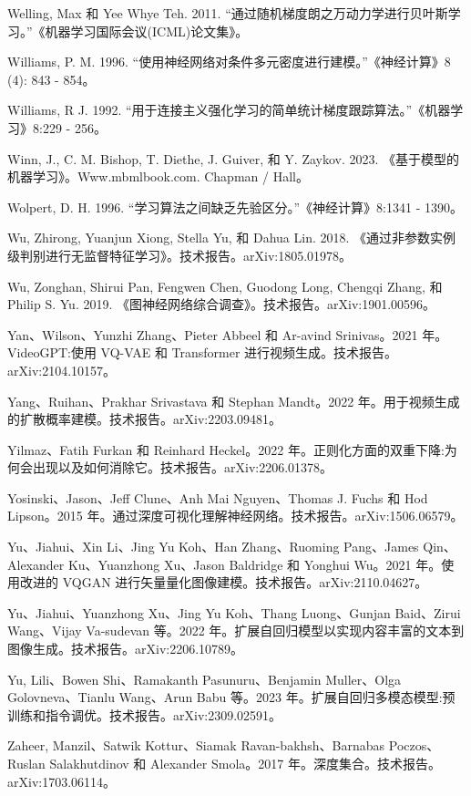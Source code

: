 \documentclass[10pt]{article}
\begin{document}
Welling, Max 和 Yee Whye Teh. 2011. “通过随机梯度朗之万动力学进行贝叶斯学习。”《机器学习国际会议(ICML)论文集》。

Williams, P. M. 1996. “使用神经网络对条件多元密度进行建模。”《神经计算》8 (4): 843 - 854。

Williams, R J. 1992. “用于连接主义强化学习的简单统计梯度跟踪算法。”《机器学习》8:229 - 256。

Winn, J., C. M. Bishop, T. Diethe, J. Guiver, 和 Y. Zaykov. 2023. 《基于模型的机器学习》。Www.mbmlbook.com. Chapman / Hall。

Wolpert, D. H. 1996. “学习算法之间缺乏先验区分。”《神经计算》8:1341 - 1390。

Wu, Zhirong, Yuanjun Xiong, Stella Yu, 和 Dahua Lin. 2018. 《通过非参数实例级判别进行无监督特征学习》。技术报告。arXiv:1805.01978。

Wu, Zonghan, Shirui Pan, Fengwen Chen, Guodong Long, Chengqi Zhang, 和 Philip S. Yu. 2019. 《图神经网络综合调查》。技术报告。arXiv:1901.00596。

Yan、Wilson、Yunzhi Zhang、Pieter Abbeel 和 Ar-avind Srinivas。2021 年。VideoGPT:使用 VQ-VAE 和 Transformer 进行视频生成。技术报告。arXiv:2104.10157。

Yang、Ruihan、Prakhar Srivastava 和 Stephan Mandt。2022 年。用于视频生成的扩散概率建模。技术报告。arXiv:2203.09481。

Yilmaz、Fatih Furkan 和 Reinhard Heckel。2022 年。正则化方面的双重下降:为何会出现以及如何消除它。技术报告。arXiv:2206.01378。

Yosinski、Jason、Jeff Clune、Anh Mai Nguyen、Thomas J. Fuchs 和 Hod Lipson。2015 年。通过深度可视化理解神经网络。技术报告。arXiv:1506.06579。

Yu、Jiahui、Xin Li、Jing Yu Koh、Han Zhang、Ruoming Pang、James Qin、Alexander Ku、Yuanzhong Xu、Jason Baldridge 和 Yonghui Wu。2021 年。使用改进的 VQGAN 进行矢量量化图像建模。技术报告。arXiv:2110.04627。

Yu、Jiahui、Yuanzhong Xu、Jing Yu Koh、Thang Luong、Gunjan Baid、Zirui Wang、Vijay Va-sudevan 等。2022 年。扩展自回归模型以实现内容丰富的文本到图像生成。技术报告。arXiv:2206.10789。

Yu, Lili、Bowen Shi、Ramakanth Pasunuru、Benjamin Muller、Olga Golovneva、Tianlu Wang、Arun Babu 等。2023 年。扩展自回归多模态模型:预训练和指令调优。技术报告。arXiv:2309.02591。

Zaheer, Manzil、Satwik Kottur、Siamak Ravan-bakhsh、Barnabas Poczos、Ruslan Salakhutdinov 和 Alexander Smola。2017 年。深度集合。技术报告。arXiv:1703.06114。
\end{document}
